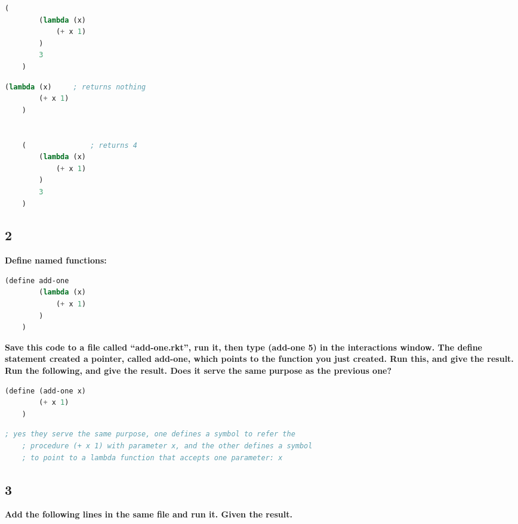 \documentclass{article}
\begin{document}
\begin{lstlisting}[language=lisp]
    (
        (lambda (x) 
            (+ x 1)
        ) 
        3
    ) 
\end{lstlisting}

\begin{lstlisting}[language=lisp,style=redStyle]
    (lambda (x)     ; returns nothing
        (+ x 1)
    ) 


    (               ; returns 4
        (lambda (x) 
            (+ x 1)
        ) 
        3
    )  
\end{lstlisting}

\subsection*{2}
\begin{adjustwidth}{2em}{0em}
    \textbf{Define named functions:}
\end{adjustwidth}

\begin{lstlisting}[language=lisp]
    (define add-one 
        (lambda (x) 
            (+ x 1)
        )
    ) 
\end{lstlisting}
\begin{adjustwidth}{2em}{0em}
    \textbf{Save this code to a file called “add-one.rkt”, run it, then type (add-one 5) in the interactions window. The define statement created a pointer, called add-one, which points to the function you just created. Run this, and give the result.
    Run the following, and give the result. Does it serve the same purpose as the previous one? 
    }
\end{adjustwidth}

\begin{lstlisting}[language=lisp]
    (define (add-one x) 
        (+ x 1)
    ) 
\end{lstlisting}

\begin{lstlisting}[language=lisp,style=redStyle]
    ; yes they serve the same purpose, one defines a symbol to refer the 
    ; procedure (+ x 1) with parameter x, and the other defines a symbol 
    ; to point to a lambda function that accepts one parameter: x
\end{lstlisting}

\subsection*{3}
\begin{adjustwidth}{2em}{0em}
    \textbf{Add the following lines in the same file and run it. Given the result. }
\end{adjustwidth}
\end{document}
